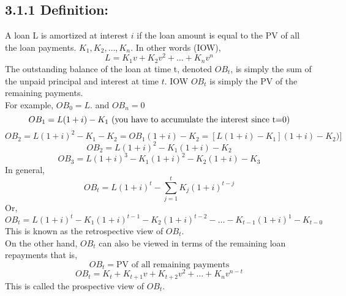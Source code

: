 \documentclass[12pt]{article}
\begin{document}
\subsection{3.1.1 Definition:}
A loan L is amortized at interest $i$ if the loan amount is equal to the PV of all the 
loan payments. $K_1, K_2, \dots, K_n$. In other words (IOW),\\
$$
L = K_1v + K_2v^2 + \dots + K_nv^n
$$
The outstanding balance of the loan at time t, denoted $OB_t$, is simply the sum
of the unpaid principal and interest at time $t$. IOW $OB_t$ is simply the
PV of the remaining payments.\\
For example, $OB_0 = L$. and $OB_n = 0$
$$
OB_1 = L(1+i) - K_1 \text{ (you have to accumulate the interest since t=0)}\\
$$
$$
OB_2 = L(1+i)^2 - K_1 - K_2 = OB_1(1+i) - K_2 = [L(1+i) - K_1](1+i) - K_2)]
$$
$$
OB_2 = L(1+i)^2 - K_1(1+i) - K_2
$$
$$
OB_3 = L(1+i)^3 - K_1(1+i)^2 - K_2(1+i) - K_3
$$
In general, 
$$
OB_t = L(1+i)^t - \sum_{j=1}^{t}K_j(1+i)^{t-j}
$$
Or,
$$
OB_t = L(1+i)^t - K_1(1+i)^{t-1} - K_2(1+i)^{t-2} - \dots - K_{t-1}(1+i)^1 - K_{t-0}
$$
This is known as the retrospective view of $OB_t$.\\
On the other hand, $OB_t$ can also be viewed in terms of the remaining loan
repayments that is,
$$
OB_t = \text{PV of all remaining payments}
$$
$$
OB_t = K_t + K_{t+1}v + K_{t+2}v^2 + \dots + K_n v^{n-t}
$$
This is called the prospective view of $OB_t$.\\




 
 
\end{document}
